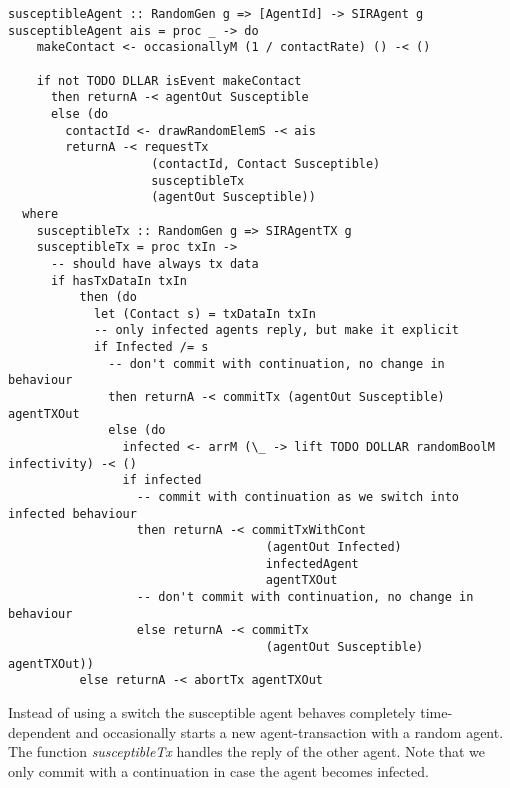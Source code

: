 \begin{verbatim}
susceptibleAgent :: RandomGen g => [AgentId] -> SIRAgent g
susceptibleAgent ais = proc _ -> do
    makeContact <- occasionallyM (1 / contactRate) () -< ()

    if not TODO DLLAR isEvent makeContact
      then returnA -< agentOut Susceptible
      else (do
        contactId <- drawRandomElemS -< ais
        returnA -< requestTx 
                    (contactId, Contact Susceptible) 
                    susceptibleTx
                    (agentOut Susceptible))
  where
    susceptibleTx :: RandomGen g => SIRAgentTX g
    susceptibleTx = proc txIn ->
      -- should have always tx data
      if hasTxDataIn txIn 
          then (do
            let (Contact s) = txDataIn txIn 
            -- only infected agents reply, but make it explicit
            if Infected /= s
              -- don't commit with continuation, no change in behaviour
              then returnA -< commitTx (agentOut Susceptible) agentTXOut
              else (do
                infected <- arrM (\_ -> lift TODO DOLLAR randomBoolM infectivity) -< ()
                if infected
                  -- commit with continuation as we switch into infected behaviour
                  then returnA -< commitTxWithCont 
                                    (agentOut Infected) 
                                    infectedAgent
                                    agentTXOut
                  -- don't commit with continuation, no change in behaviour
                  else returnA -< commitTx 
                                    (agentOut Susceptible) agentTXOut))
          else returnA -< abortTx agentTXOut
\end{verbatim}

Instead of using a switch the susceptible agent behaves completely time-dependent and occasionally starts a new agent-transaction with a random agent. The function \textit{susceptibleTx} handles the reply of the other agent. Note that we only commit with a continuation in case the agent becomes infected.

